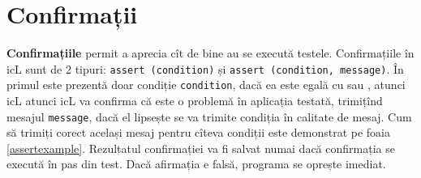 \section{Confirmații}

{\bf Confirmațiile} permit a aprecia cît de bine au se execută testele. Confirmațiile în icL sunt de 2 tipuri: \texttt{assert (condition)} și \texttt{assert (condition, message)}. În primul este prezentă doar condiție \texttt{condition}, dacă ea este egală cu \false{} sau \void, atunci icL atunci icL va confirma că este o problemă în aplicația testată, trimițînd mesajul \texttt{message}, dacă el lipsește se va trimite condiția în calitate de mesaj. Cum să trimiți corect același mesaj pentru cîteva condiții este demonstrat pe foaia \ref{assertexample}. Rezultatul confirmației va fi salvat numai dacă confirmația se execută în pas din test. Dacă afirmația e falsă, programa se oprește imediat.

\begin{sourcecode}
\label{assertexample}
\inputminted[linenos]{icl}{../sources/assertexample.icL}
\end{sourcecode}
